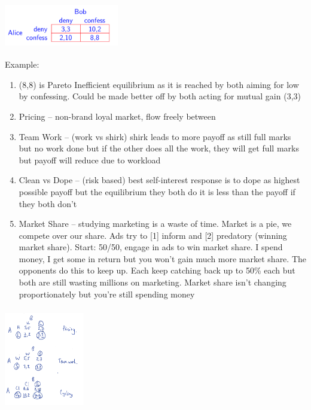 \documentclass[11pt, english]{article}
\begin{document}
	\begin{center}
		\includegraphics[width=5cm,height=2cm]{EC315-IMG/6.png}
	\end{center}

	Example:

	\begin{enumerate}
	\setlength\itemsep{0cm}
		\item (8,8) is Pareto Inefficient equilibrium as it is reached by both aiming for low by confessing. Could be made better off by both acting for mutual gain (3,3)
		\item Pricing – non-brand loyal market, flow freely between

		\item Team Work – (work vs shirk) shirk leads to more payoff as still full marks but no work done but if the other does all the work, they will get full marks but payoff will reduce due to workload
		\item Clean vs Dope – (risk based) best self-interest response is to dope as highest possible payoff but the equilibrium they both do it is less than the payoff if they both don’t
		\item Market Share – studying marketing is a waste of time. Market is a pie, we compete over our share. Ads try to [1] inform and [2] predatory (winning market share). Start: 50/50, engage in ads to win market share. I spend money, I get some in return but you won’t gain much more market share. The opponents do this to keep up. Each keep catching back up to 50\% each but both are still wasting millions on marketing. Market share isn’t changing proportionately but you’re still spending money
	\end{enumerate}

	\begin{center}
		\includegraphics[width=3.5cm,height=4.5cm]{EC315-IMG/7.png}
	\end{center}
\end{document}
